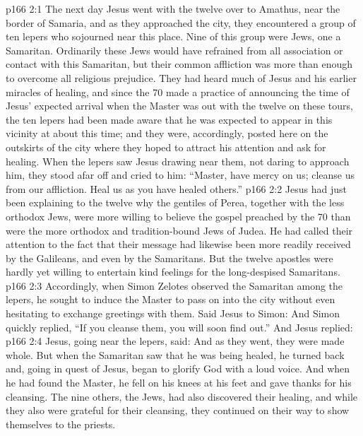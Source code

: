 \vs p166 2:1 The next day Jesus went with the twelve over to Amathus, near the border of Samaria, and as they approached the city, they encountered a group of ten lepers who sojourned near this place. Nine of this group were Jews, one a Samaritan. Ordinarily these Jews would have refrained from all association or contact with this Samaritan, but their common affliction was more than enough to overcome all religious prejudice. They had heard much of Jesus and his earlier miracles of healing, and since the 70 made a practice of announcing the time of Jesus’ expected arrival when the Master was out with the twelve on these tours, the ten lepers had been made aware that he was expected to appear in this vicinity at about this time; and they were, accordingly, posted here on the outskirts of the city where they hoped to attract his attention and ask for healing. When the lepers saw Jesus drawing near them, not daring to approach him, they stood afar off and cried to him: “Master, have mercy on us; cleanse us from our affliction. Heal us as you have healed others.”
\vs p166 2:2 Jesus had just been explaining to the twelve why the gentiles of Perea, together with the less orthodox Jews, were more willing to believe the gospel preached by the 70 than were the more orthodox and tradition\hyp{}bound Jews of Judea. He had called their attention to the fact that their message had likewise been more readily received by the Galileans, and even by the Samaritans. But the twelve apostles were hardly yet willing to entertain kind feelings for the long\hyp{}despised Samaritans.
\vs p166 2:3 Accordingly, when Simon Zelotes observed the Samaritan among the lepers, he sought to induce the Master to pass on into the city without even hesitating to exchange greetings with them. Said Jesus to Simon:  And Simon quickly replied, “If you cleanse them, you will soon find out.” And Jesus replied: 
\vs p166 2:4 Jesus, going near the lepers, said:  And as they went, they were made whole. But when the Samaritan saw that he was being healed, he turned back and, going in quest of Jesus, began to glorify God with a loud voice. And when he had found the Master, he fell on his knees at his feet and gave thanks for his cleansing. The nine others, the Jews, had also discovered their healing, and while they also were grateful for their cleansing, they continued on their way to show themselves to the priests.
